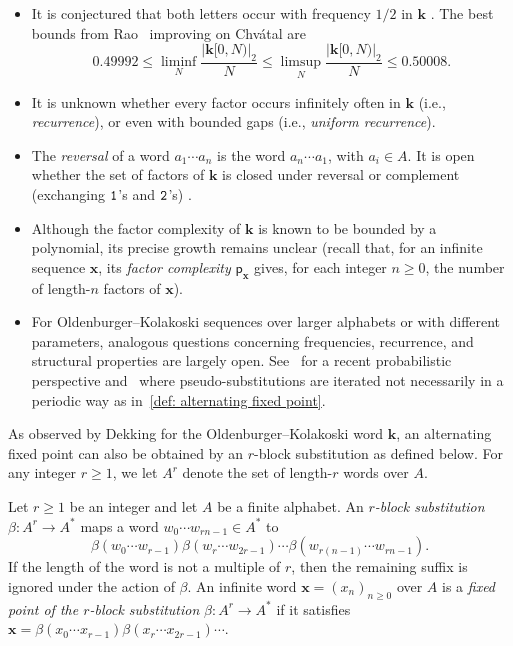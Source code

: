\documentclass[12pt,reqno]{article}
\begin{document}
\begin{itemize}
\item It is conjectured that both letters occur with frequency $1/2$ in $\mathbf{k}$ \cite{Keane91}. The best bounds from Rao~\cite{Rao-Kola} improving on Chv\'atal are
  \[
    0.49992 \le \liminf_N  \frac{|\mathbf{k}[0,N)|_2}{N}
    \le \limsup_N  \frac{|\mathbf{k}[0,N)|_2}{N} \le 0.50008.
  \]
  
    
  \item It is unknown whether every factor occurs infinitely often in $\mathbf{k}$ (i.e.,  \emph{recurrence}), or even with bounded gaps (i.e.,  \emph{uniform recurrence}).

  \item The {\em reversal} of a word $a_1\cdots a_n$ is the word $a_n\cdots a_1$,  with $a_i\in A$. It is open whether the set of factors of $\mathbf{k}$ is closed under reversal or complement (exchanging ${\tt 1}$'s and ${\tt 2}$'s) \cite{Kimberling}.

  \item Although the factor complexity of $\mathbf{k}$ is known to be bounded by a polynomial, its precise growth remains unclear (recall that,  for an infinite sequence $\mathbf{x}$,  its \emph{factor complexity} $\mathsf{p}_\mathbf{x}$ gives,  for each integer $n\ge0$,  the number of length-$n$ factors of $\mathbf{x}$).

  \item For Oldenburger--Kolakoski sequences over larger alphabets or with different parameters, analogous questions concerning frequencies, recurrence, and structural properties are largely open.  See~\cite{Jamet24} for a recent probabilistic perspective and~\cite{AJLTC-2024} where pseudo-substitutions are iterated not necessarily in a periodic way as in~\cref{def: alternating fixed point}. 
\end{itemize}

As observed by Dekking \cite{DekkingReg} for the Oldenburger--Kolakoski word $\mathbf{k}$, an alternating fixed point can also be obtained by an $r$-block substitution as defined below.  For any integer $r\ge 1$,  we let $A^r$ denote the set of length-$r$ words over $A$.

\begin{definition}
  Let $r\ge 1$ be an integer and let $A$ be a finite alphabet. An {\em$r$-block substitution} $\beta:A^r\to A^*$ maps a word $w_0\cdots w_{rn-1} \in A^*$ to 
  \[
  \beta(w_0\cdots w_{r-1}) \beta(w_r\cdots w_{2r-1})\cdots \beta(w_{r(n-1)}\cdots w_{rn-1}).
  \] 
  If the length of the word is not a multiple of $r$, then the remaining suffix is ignored under the action of $\beta$. An infinite word $\mathbf{x}=(x_n)_{n\ge 0}$ over $A$ is a {\em fixed point of the $r$-block substitution} $\beta:A^r\to A^*$ if it satisfies $\mathbf{x}= \beta(x_0\cdots x_{r-1}) \beta(x_r\cdots x_{2r-1})\cdots$.
\end{definition}
\end{document}

